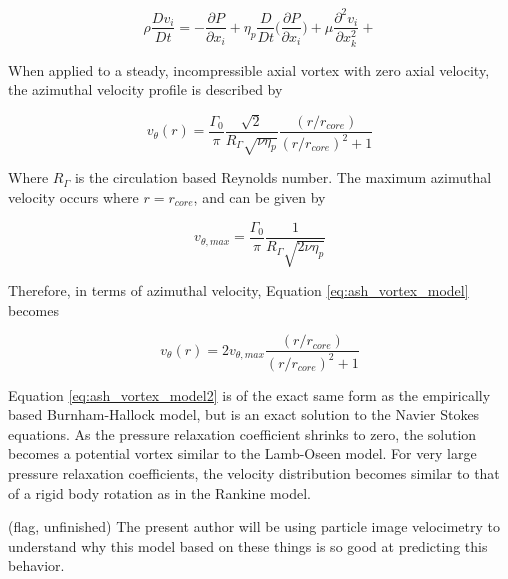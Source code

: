 \begin{equation}
\rho \frac{Dv_i}{Dt} = -\frac{\partial P}{\partial x_i} +
\eta_p \frac{D}{Dt} \Bigg( \frac{\partial P}{\partial x_i} \Bigg) + 
\mu \frac{\partial^2 v_i}{\partial x_{k}^2} + 
\label{eq:modified_ns4}
\end{equation}

When applied to a steady, incompressible axial vortex with zero axial velocity, 
the azimuthal velocity profile is described by

\begin{equation}
v_\theta(r) = \frac{\Gamma_0}{\pi} \frac{\sqrt{2}}{R_\Gamma \sqrt{\nu \eta_p}}
\frac{(r / r_{core})}{(r/r_{core})^2 + 1}
\label{eq:ash_vortex_model}
\end{equation}

\noindent
Where $R_\Gamma$ is the circulation based Reynolds number. The maximum 
azimuthal velocity occurs where $r = r_{core}$, and can be given by 

\begin{equation}
v_{\theta, max} = \frac{\Gamma_0}{\pi} \frac{1}{R_\Gamma \sqrt{2 \nu 
\eta_p}}
\label{eq:ash_vthetamax}
\end{equation}

\noindent
Therefore, in terms of azimuthal velocity, Equation \ref{eq:ash_vortex_model} 
becomes

\begin{equation}
v_\theta(r) = 2 v_{\theta, max}\frac{(r / r_{core})}{(r/r_{core})^2 + 1}
\label{eq:ash_vortex_model2}
\end{equation}

Equation \ref{eq:ash_vortex_model2} is of the exact same form as the 
empirically based Burnham-Hallock model, but is an exact solution to the Navier 
Stokes equations. As the pressure relaxation coefficient shrinks to zero, the 
solution becomes a potential vortex similar to the Lamb-Oseen model. For very 
large pressure relaxation coefficients, the velocity distribution becomes 
similar to that of a rigid body rotation as in the Rankine model. 

(flag, unfinished) The present author will be using particle image velocimetry 
to understand why this model based on these things is so good at predicting 
this behavior.

